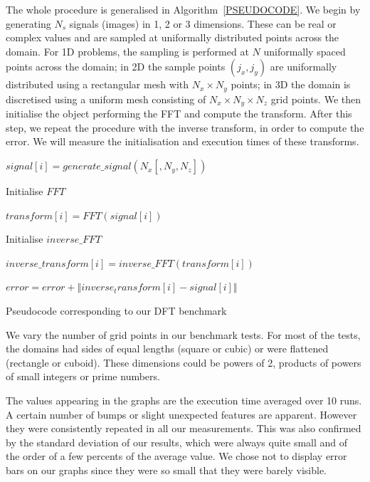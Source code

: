 \documentclass[12pt, a4paper]{article}
\begin{document}
The whole procedure is generalised in Algorithm~\ref{PSEUDOCODE}. We begin by generating $N_s$ signals 
(images) in 1, 2 or 3 dimensions. These can be real or complex values and are sampled at uniformally 
distributed points across the domain. For 1D problems, the sampling is performed at $N$ uniformally 
spaced points across the domain; in 2D the sample points $(j_x,j_y)$ are uniformally distributed 
using a rectangular mesh with $N_x\times N_y$ points; in 3D the domain is discretised using a uniform 
mesh consisting of $N_x\times N_y\times N_z$ grid points. We then initialise the object performing the FFT 
and compute the transform. After this step, we repeat the procedure with the inverse transform, in 
order to compute the error. We will measure the initialisation and execution times of these transforms.
\begin{algorithm}[H]
\centering
\begin{algorithmic}
        \STATE  $signal[i]=generate\_signal(N_x [,N_y, N_z])$
        \ENDFOR

        \STATE Initialise $FFT$

        \STATE  $transform[i]=FFT(signal[i])$
        \ENDFOR

        \STATE Initialise $inverse\_FFT$

         \STATE $inverse\_transform[i]=inverse\_FFT(transform[i])$
        \ENDFOR

          \STATE   $error=error+\left\Vert inverse_transform[i]-signal[i]\right\Vert$
        \ENDFOR
\end{algorithmic}
\caption{Pseudocode corresponding to our DFT benchmark}
\label{PSEUDOCODE}
\end{algorithm}

We vary the number of grid points in our benchmark tests. For most of the tests, the domains had 
sides of equal lengths (square or cubic) or were flattened (rectangle or cuboid). These dimensions 
could be powers of 2, products of powers of small integers or prime numbers.

The values appearing in the graphs are the execution time averaged over 10 runs. A certain number 
of bumps or slight unexpected features are apparent. However they were consistently repeated in all 
our measurements. This was also confirmed by the standard deviation of our results, which were always 
quite small and of the order of a few percents of the average value. We chose not to display error 
bars on our graphs since they were so small that they were barely visible. 
\end{document}
